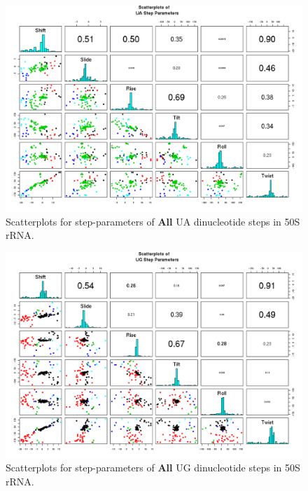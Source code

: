 \begin{figure}[H]
\centering
\includegraphics[angle=90, scale=0.6]{All/UA.png}
\caption{Scatterplots for step-parameters of \textbf{All} UA dinucleotide steps
in 50S rRNA.}
\label{fig:stepsUA}
\end{figure}

\begin{figure}[H]
\centering
\includegraphics[angle=90, scale=0.6]{All/UG.png}
\caption{Scatterplots for step-parameters of \textbf{All} UG dinucleotide steps
in 50S rRNA.}
\label{fig:stepsUG}
\end{figure}

